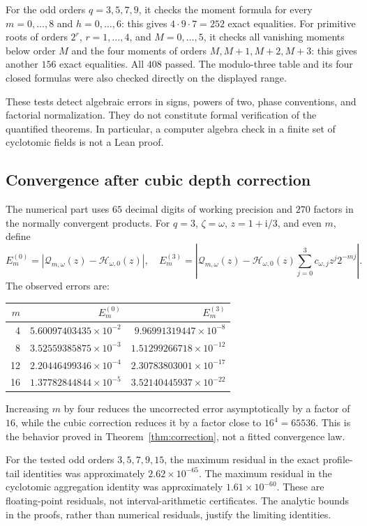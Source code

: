 \documentclass[11pt,letterpaper]{article}
\numberwithin{equation}{section}
\theoremstyle{definition}
\theoremstyle{remark}
\newcommand{\ii}{\mathrm i}
\newcommand{\Hp}{\mathcal H}
\newcommand{\Qp}{\mathcal Q}
\begin{document}
For the odd orders \(q=3,5,7,9\), it checks the moment formula for every \(m=0,\ldots,8\) and \(h=0,\ldots,6\): this gives \(4\cdot9\cdot7=252\) exact equalities. For primitive roots of orders \(2^r\), \(r=1,\ldots,4\), and \(M=0,\ldots,5\), it checks all vanishing moments below order \(M\) and the four moments of orders \(M,M+1,M+2,M+3\): this gives another \(156\) exact equalities. All \(408\) passed. The modulo-three table and its four closed formulas were also checked directly on the displayed range.

These tests detect algebraic errors in signs, powers of two, phase conventions, and factorial normalization. They do not constitute formal verification of the quantified theorems. In particular, a computer algebra check in a finite set of cyclotomic fields is not a Lean proof.

\subsection{Convergence after cubic depth correction}
The numerical part uses \(65\) decimal digits of working precision and \(270\) factors in the normally convergent products. For \(q=3\), \(\zeta=\omega\), \(z=1+\ii/3\), and even \(m\), define
\[
 E_m^{(0)}=|\Qp_{m,\omega}(z)-\Hp_{\omega,0}(z)|,
 \quad
 E_m^{(3)}=\left|\Qp_{m,\omega}(z)-\Hp_{\omega,0}(z)
                \sum_{j=0}^3c_{\omega,j}z^j2^{-mj}\right|.
\]
The observed errors are:
\begin{center}
\begin{tabular}{rrr}
\toprule
\(m\)&\(E_m^{(0)}\)&\(E_m^{(3)}\)\\
\midrule
4&\(5.60097403435\times10^{-2}\)&\(9.96991319447\times10^{-8}\)\\
8&\(3.52559385875\times10^{-3}\)&\(1.51299266718\times10^{-12}\)\\
12&\(2.20446499346\times10^{-4}\)&\(2.30783803001\times10^{-17}\)\\
16&\(1.37782844844\times10^{-5}\)&\(3.52140445937\times10^{-22}\)\\
\bottomrule
\end{tabular}
\end{center}
Increasing \(m\) by four reduces the uncorrected error asymptotically by a factor of \(16\), while the cubic correction reduces it by a factor close to \(16^4=65536\). This is the behavior proved in Theorem~\ref{thm:correction}, not a fitted convergence law.

For the tested odd orders \(3,5,7,9,15\), the maximum residual in the exact profile-tail identities was approximately \(2.62\times10^{-65}\). The maximum residual in the cyclotomic aggregation identity was approximately \(1.61\times10^{-60}\). These are floating-point residuals, not interval-arithmetic certificates. The analytic bounds in the proofs, rather than numerical residuals, justify the limiting identities.
\end{document}
